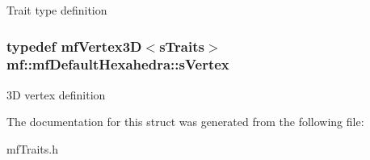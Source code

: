 \label{structmf_1_1mfDefaultHexahedra_a557747fd5ab6ee8bd28a0f1a3f201473}
Trait type definition \hypertarget{structmf_1_1mfDefaultHexahedra_a3cc593a4024b66fb2bf899e4f650c784}{
\subsubsection[{sVertex}]{\setlength{\rightskip}{0pt plus 5cm}typedef {\bf mfVertex3D}$<${\bf sTraits}$>$ {\bf mf::mfDefaultHexahedra::sVertex}}}
\label{structmf_1_1mfDefaultHexahedra_a3cc593a4024b66fb2bf899e4f650c784}
3D vertex definition 

The documentation for this struct was generated from the following file:\begin{DoxyCompactItemize}
\item 
mfTraits.h\end{DoxyCompactItemize}
